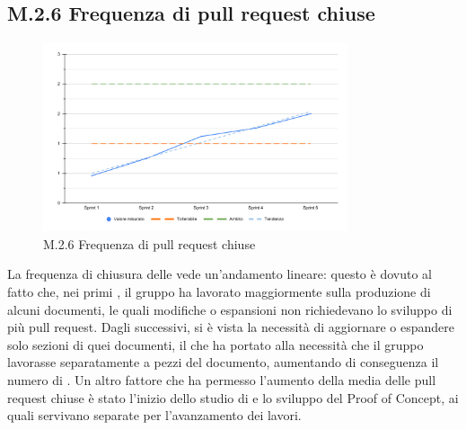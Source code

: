 \subsection{M.2.6 Frequenza di pull request chiuse}
\begin{figure}[H]
    \centering
    \includegraphics[width=0.8\textwidth]{assets/frequenza_pull_request.pdf}
    \caption{M.2.6 Frequenza di pull request chiuse}
\end{figure}

\par La frequenza di chiusura delle  vede un'andamento lineare: questo è dovuto al fatto che, nei primi , il gruppo ha lavorato maggiormente sulla produzione di alcuni documenti, le quali modifiche o espansioni non richiedevano lo sviluppo di più pull request. Dagli  successivi, si è vista la necessità di aggiornare o espandere solo sezioni di quei documenti, il che ha portato alla necessità che il gruppo lavorasse separatamente a pezzi del documento, aumentando di conseguenza il numero di . Un altro fattore che ha permesso l'aumento della media delle pull request chiuse è stato l'inizio dello studio di  e lo sviluppo del Proof of Concept, ai quali servivano  separate per l'avanzamento dei lavori.